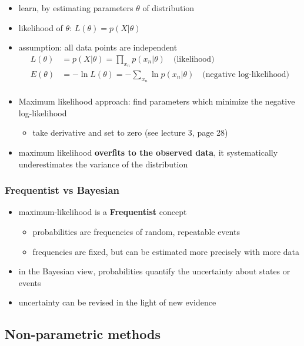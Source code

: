\documentclass{article}
\renewcommand{\emph}[1]{\textbf{#1}}
\begin{document}
\begin{itemize}
  \item learn, by estimating parameters $\theta$ of distribution
  \item likelihood of $\theta$: $L(\theta) = p(X|\theta)$
  \item assumption: all data points are independent
  \begin{align*}
    L(\theta) &= p(X|\theta) = \prod_{x_n} p(x_n|\theta) \quad \text{(likelihood)} \\
    E(\theta) &= - \ln L(\theta) = -\sum_{x_n} \ln p(x_n|\theta) \quad \text{(negative log-likelihood)} \\
  \end{align*}
  \item Maximum likelihood approach: find parameters which minimize the negative log-likelihood
  \begin{itemize}
    \item take derivative and set to zero (see lecture 3, page 28)
  \end{itemize}
  \item maximum likelihood \emph{overfits to the observed data}, it systematically underestimates the variance of the distribution
\end{itemize}

\subsubsection{Frequentist vs Bayesian}

\begin{itemize}
  \item maximum-likelihood is a \emph{Frequentist} concept
  \begin{itemize}
    \item probabilities are frequencies of random, repeatable events
    \item frequencies are fixed, but can be estimated more precisely with more data
  \end{itemize}
  \item in the Bayesian view, probabilities quantify the uncertainty about states or events
  \item uncertainty can be revised in the light of new evidence
\end{itemize}

\subsection{Non-parametric methods}
\end{document}
